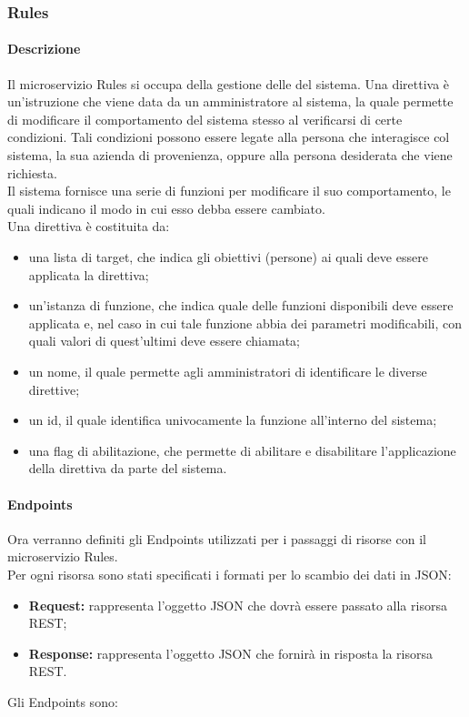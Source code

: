 \subsubsection{Rules}
\paragraph{Descrizione}
Il microservizio Rules si occupa della gestione delle  del sistema. Una direttiva è un'istruzione che viene data da un amministratore al sistema, la quale permette di modificare il comportamento del sistema stesso al verificarsi di certe condizioni. Tali condizioni possono essere legate alla persona che interagisce col sistema, la sua azienda di provenienza, oppure alla persona desiderata che viene richiesta.\\
Il sistema fornisce una serie di funzioni per modificare il suo comportamento, le quali indicano il modo in cui esso debba essere cambiato. \\
Una direttiva è costituita da:
\begin{itemize}
	\item una lista di target, che indica gli obiettivi (persone) ai quali deve essere applicata la direttiva;
	\item un'istanza di funzione, che indica quale delle funzioni disponibili deve essere applicata e, nel caso in cui tale funzione abbia dei parametri modificabili, con quali valori di quest'ultimi deve essere chiamata;
	\item un nome, il quale permette agli amministratori di identificare le diverse direttive;
	\item un id, il quale identifica univocamente la funzione all'interno del sistema;
	\item una flag di abilitazione, che permette di abilitare e disabilitare l'applicazione della direttiva da parte del sistema.
\end{itemize}

\paragraph{Endpoints}

Ora verranno definiti gli Endpoints utilizzati per i passaggi di risorse con il microservizio Rules.\\
Per ogni risorsa sono stati specificati i formati per lo scambio dei dati in JSON:
\begin{itemize}
\item \textbf{Request:} rappresenta l’oggetto JSON che dovrà essere passato alla risorsa REST;
\item \textbf{Response:} rappresenta l’oggetto JSON che fornirà in risposta la risorsa REST.
\end{itemize}
Gli Endpoints sono:

